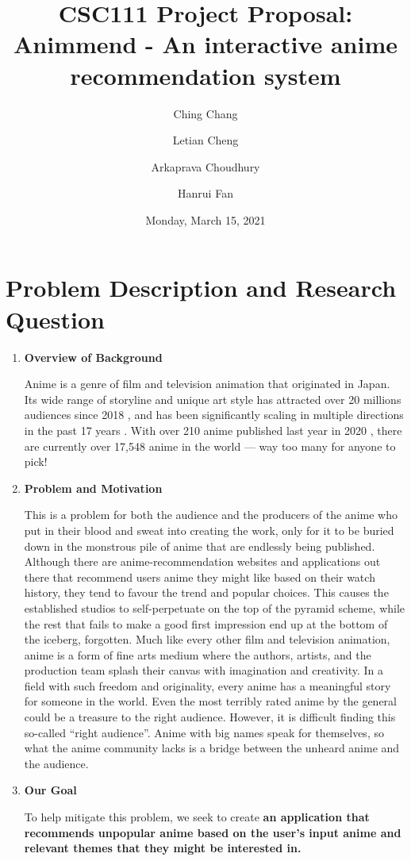 \documentclass[fontsize=11pt]{article}
\title{CSC111 Project Proposal:\\\textbf{Animmend - An interactive anime recommendation system}}
\author{
  Ching Chang\\
  \and
  Letian Cheng\\
  \and
  Arkaprava Choudhury\\
  \and
  Hanrui Fan
}
\date{Monday, March 15, 2021}
\begin{document}
\maketitle

\section*{Problem Description and Research Question}
\begin{enumerate}
    \item \textbf{Overview of Background}
    
    \quad Anime is a genre of film and television animation that originated in Japan. Its wide range of storyline and unique art style has attracted over 20 millions audiences since 2018 \citep{Ani18}, and has been significantly scaling in multiple directions in the past 17 years \citep{Ell18}. With over 210 anime published last year in 2020 \citep{wiki21}, there are currently over 17,548 anime in the world \citep{MyA21} — way too many for anyone to pick!
    
    \item \textbf{Problem and Motivation}
    
    \quad This is a problem for both the audience and the producers of the anime who put in their blood and sweat into creating the work, only for it to be buried down in the monstrous pile of anime that are endlessly being published. Although there are anime-recommendation websites and applications out there that recommend users anime they might like based on their watch history, they tend to favour the trend and popular choices. This causes the established studios to self-perpetuate on the top of the pyramid scheme, while the rest that fails to make a good first impression end up at the bottom of the iceberg, forgotten. Much like every other film and television animation, anime is a form of fine arts medium where the authors, artists, and the production team splash their canvas with imagination and creativity. In a field with such freedom and originality, every anime has a meaningful story for someone in the world. Even the most terribly rated anime by the general could be a treasure to the right audience. However, it is difficult finding this so-called “right audience”. Anime with big names speak for themselves, so what the anime community lacks is a bridge between the unheard anime and the audience.
    
    \item \textbf{Our Goal}
    
    \quad To help mitigate this problem, we seek to create \textbf{an application that recommends unpopular anime based on the user’s input anime and relevant themes that they might be interested in.}
\end{enumerate}
\end{document}
